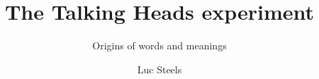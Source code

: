 \author{Luc Steels}
\title{The Talking Heads experiment}
\subtitle{Origins of words and meanings}
\renewcommand{\lsSeries}{cmle}
\renewcommand{\lsSeriesNumber}{1}

